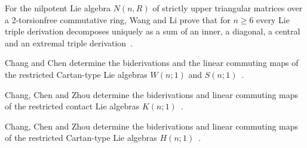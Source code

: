 For the nilpotent Lie algebra $N(n,R)$ of strictly upper triangular matrices over a 2-torsionfree commutative ring, Wang and Li prove that for $n\geq 6$ every Lie triple derivation decomposes uniquely as a sum of an inner, a diagonal, a central and an extremal triple derivation~\cite{WlLieTripleDerivationOfTheLieAlg2009}.

Chang and Chen determine the biderivations and the linear commuting maps of the restricted Cartan-type Lie algebras $W(n;1)$ and $S(n;1)$~\cite{WlBiderivationsAndLinearCommutin2018}.

Chang, Chen and Zhou determine the biderivations and linear commuting maps of the restricted contact Lie algebras $K(n;1)$~\cite{WlBiderivationsAndLinearCommutin2021}.

Chang, Chen and Zhou determine the biderivations and linear commuting maps of the restricted Cartan-type Lie algebras $H(n;1)$~\cite{WlBiderivationsAndLinearCommutin2019}.
